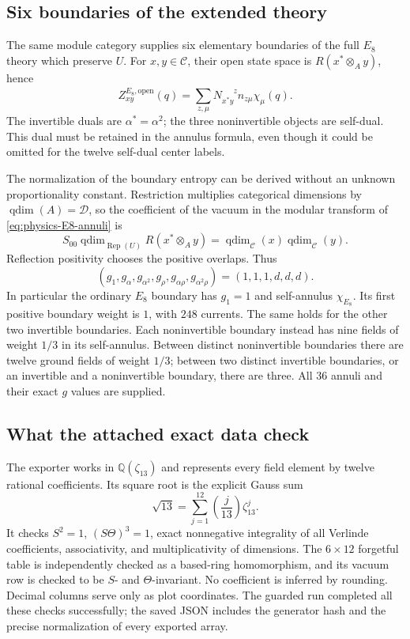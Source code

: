 \documentclass[11pt,a4paper]{article}
\theoremstyle{definition}
\begin{document}
\subsection{Six boundaries of the extended theory}

The same module category supplies six elementary boundaries of the full
$E_8$ theory which preserve $U$. For $x,y\in\mathcal C$, their open
state space is $R(x^*\otimes_A y)$, hence
\begin{equation}
 Z^{E_8,\mathrm{open}}_{xy}(q)
  =\sum_{z,\mu}N_{x^*y}^{\phantom{x^*y}z}
                  n_{z\mu}\chi_\mu(q).
 \label{eq:physics-E8-annuli}
\end{equation}
The invertible duals are $\alpha^*=\alpha^2$; the three noninvertible
objects are self-dual. This dual must be retained in the annulus formula,
even though it could be omitted for the twelve self-dual center labels.

The normalization of the boundary entropy can be derived without an
unknown proportionality constant. Restriction multiplies categorical
dimensions by $\operatorname{qdim}(A)=\mathcal D$, so the coefficient
of the vacuum in the modular transform of
\eqref{eq:physics-E8-annuli} is
\[
 S_{00}\operatorname{qdim}_{\operatorname{Rep}(U)}
       R(x^*\otimes_A y)
 =\operatorname{qdim}_{\mathcal C}(x)
       \operatorname{qdim}_{\mathcal C}(y).
\]
Reflection positivity chooses the positive overlaps. Thus
\begin{equation}
 (g_1,g_\alpha,g_{\alpha^2},g_\rho,g_{\alpha\rho},g_{\alpha^2\rho})
   =(1,1,1,d,d,d).
 \label{eq:physics-E8-g}
\end{equation}
In particular the ordinary $E_8$ boundary has $g_1=1$ and self-annulus
$\chi_{E_8}$. Its first positive boundary weight is $1$, with $248$
currents. The same holds for the other two invertible boundaries.
Each noninvertible boundary instead has nine fields of weight $1/3$
in its self-annulus. Between distinct noninvertible boundaries there
are twelve ground fields of weight $1/3$; between two distinct
invertible boundaries, or an invertible and a noninvertible boundary,
there are three. All $36$ annuli and their exact $g$ values are supplied.

\subsection{What the attached exact data check}

The exporter  works in
$\mathbb Q(\zeta_{13})$ and represents every field element by twelve
rational coefficients. Its square root is the explicit Gauss sum
\[
 \sqrt{13}=\sum_{j=1}^{12}\left(\frac j{13}\right)\zeta_{13}^j.
\]
It checks $S^2=1$, $(S\Theta)^3=1$, exact nonnegative integrality of
all Verlinde coefficients, associativity, and multiplicativity of
dimensions. The $6\times12$ forgetful table is independently checked
as a based-ring homomorphism, and its vacuum row is checked to be
$S$- and $\Theta$-invariant. No coefficient is inferred by rounding.
Decimal columns serve only as plot coordinates.
The guarded run completed all these checks successfully; the saved
JSON includes the generator hash and the precise normalization of
every exported array.
\end{document}
